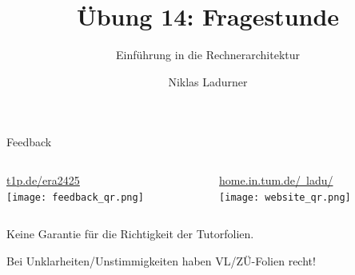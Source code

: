 \documentclass[
  german,            %
  aspectratio=169,    %
]{tumbeamer}
\title{Übung 14: Fragestunde}
\subtitle{Einführung in die Rechnerarchitektur}
\author{Niklas Ladurner}
\institute{\theChairName\\\theDepartmentName\\\theUniversityName}
\date{\DTMdisplaydate{2025}{01}{31}{-1}}
\begin{document}
\maketitle

\begin{frame}[c]{Feedback}{}
	\begin{columns}[c]
		\begin{column}{0.5\textwidth}
			\begin{center}
				\LARGE  \href{https://t1p.de/era2425}{t1p.de/era2425}\\
				\texttt{[image: feedback\_qr.png]}
			\end{center}
		\end{column}
		\begin{column}{0.5\textwidth}
			\begin{center}
				\LARGE  \href{https://home.in.tum.de/~ladu/}{home.in.tum.de/\string~ladu/}\\
				\texttt{[image: website\_qr.png]}
			\end{center}
		\end{column}
	\end{columns}
\end{frame}

\begin{frame}[c, fragile]{}{}
	\begin{center}
		\LARGE  Keine Garantie für die Richtigkeit der Tutorfolien.

		\Large Bei Unklarheiten/Unstimmigkeiten haben VL/ZÜ-Folien recht!
	\end{center}
\end{frame}
\end{document}
